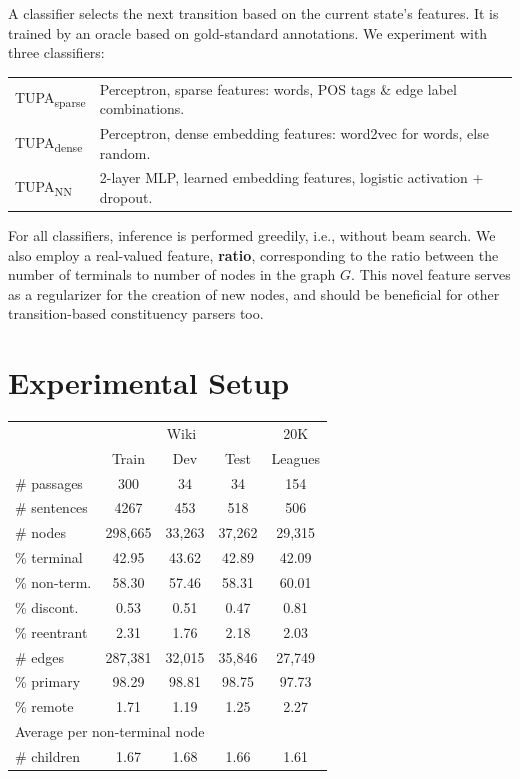 \documentclass[a0,portrait]{a0poster}
\newcommand{\parser}[1]{TUPA\textsubscript{#1}}
\begin{document}
\begin{multicols}{2}
A classifier selects the next transition based on the current state's features.
It is trained by an oracle based on gold-standard annotations.
We experiment with three classifiers:
\begin{flushleft}
	\begin{tabular}{ll}
	\parser{sparse} & Perceptron, sparse features: words, POS tags \& edge label combinations. \\
	\parser{dense} & Perceptron, dense embedding features: word2vec \cite{mikolov2013efficient} for words, else random. \\
	\parser{NN} & 2-layer MLP, learned embedding features, logistic activation + dropout. \\
	\end{tabular}
\end{flushleft}

For all classifiers, inference is performed greedily, i.e., without beam search.
We also employ a real-valued feature,
\textbf{ratio}, corresponding to the ratio between the number of terminals to number of nodes
in the graph $G$.
This novel feature serves as a regularizer for the creation of new nodes,
and should be beneficial for other transition-based constituency parsers too.




\section*{Experimental Setup}

\begin{table}
	\vspace{-2cm}
	\begin{tabular}{l|ccc|c}
	& \multicolumn{3}{c|}{Wiki} & 20K \\
	& \small Train & \small Dev & \small Test & Leagues \\
	\hline
	\# passages & 300 & 34 & 34 & 154 \\
	\# sentences & 4267 & 453 & 518 & 506 \\
	\hline
	\# nodes & 298,665 & 33,263 & 37,262 & 29,315 \\
	\% terminal & 42.95 & 43.62 & 42.89 & 42.09 \\
	\% non-term. & 58.30 & 57.46 & 58.31 & 60.01 \\
	\% discont. & 0.53 & 0.51 & 0.47 & 0.81 \\
	\% reentrant & 2.31 & 1.76 & 2.18 & 2.03 \\
	\hline
	\# edges & 287,381 & 32,015 & 35,846 & 27,749 \\
	\% primary & 98.29 & 98.81 & 98.75 & 97.73 \\
	\% remote & 1.71 & 1.19 & 1.25 & 2.27 \\
	\hline
	\multicolumn{3}{l}{\footnotesize Average per non-terminal node} \\
	\# children & 1.67 & 1.68 & 1.66 & 1.61 
	\end{tabular}
\end{table}


\end{multicols}
\end{document}
